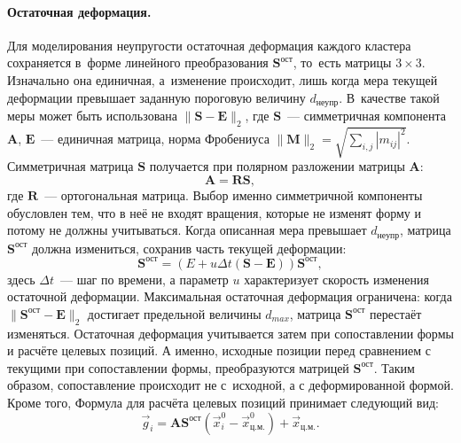\documentclass[a4paper, 14pt, titlepage]{extarticle}
\newcommand{\vect}[1]{\vec{#1}} %
\newcommand{\matx}[1]{\mathbf{#1}} %
\begin{document}
        \paragraph{Остаточная деформация.} Для моделирования неупругости остаточная деформация
        каждого кластера сохраняется в~форме линейного преобразования $\matx{S}^{ост}$, то~есть
        матрицы $3 \times 3$. Изначально она единичная, а~изменение происходит, лишь когда мера
        текущей деформации превышает заданную пороговую величину $d_{неупр}$. В~качестве такой меры может быть
        использована $ \|\matx S - \matx E\|_2 $, где $\matx S$~--- симметричная компонента $\matx
        A$, $\matx E$~--- единичная матрица, норма Фробениуса $\|\matx M\|_2 = \sqrt{\sum_{i, j} |m_{ij}|^2}$.
        Симметричная матрица $\matx S$ получается при полярном разложении матрицы $\matx A$:
        \begin{equation}\label{eq:polar_decomposition}
          \matx A = \matx R \matx S,
        \end{equation}
        где $\matx R$~--- ортогональная матрица. Выбор именно симметричной компоненты обусловлен
        тем, что в неё не входят вращения, которые не изменят форму и потому не должны учитываться.
        Когда описанная мера превышает $d_{неупр}$, матрица $\matx{S}^{ост}$ должна измениться,
        сохранив часть текущей деформации:
        \begin{equation}
          \matx{S}^{ост} = \left(E + u \Delta t (\matx S - \matx E) \right) \matx{S}^{ост},
        \end{equation}
        здесь $\Delta t$~--- шаг по времени, а параметр $u$ характеризует скорость изменения
        остаточной деформации. Максимальная остаточная деформация ограничена: когда
        $\|\matx{S}^{ост} - \matx E\|_2$ достигает предельной величины $d_{max}$, матрица
        $\matx{S}^{ост}$ перестаёт изменяться. Остаточная деформация учитывается затем при
        сопоставлении формы и расчёте целевых позиций. А именно, исходные позиции перед сравнением
        с текущими при сопоставлении формы, преобразуются матрицей $\matx{S}^{ост}$. Таким
        образом, сопоставление происходит не с~исходной, а с деформированной формой. Кроме того, Формула для
        расчёта целевых позиций принимает следующий вид:
        \begin{equation}\label{eq:goal_pos}
          \vect{g}_i = \matx{A} \matx{S}^{ост} (\vect{x}^0_i - \vect{x}^0_{ц.м.}) + \vect{x}_{ц.м.}.
        \end{equation}
\end{document}
